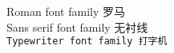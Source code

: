 \documentclass[UTF8]{ctexart}
\begin{document}
    \noindent \textrm{Roman font family 罗马}\\
    \textsf{Sans serif font family 无衬线}\\
    \texttt{Typewriter font family 打字机}\\
\end{document}
